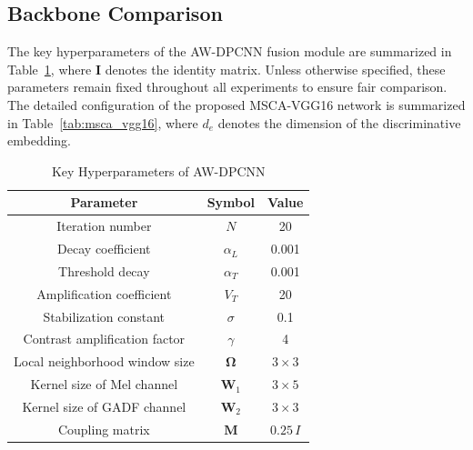 \documentclass[anonymous]{iopjournal}
\begin{document}
\subsection{Backbone Comparison}
The key hyperparameters of the AW-DPCNN fusion module are summarized in Table~\ref{tab:awdpcnn_params}, where $\mathbf I$ denotes the identity matrix. Unless otherwise specified, these parameters remain fixed throughout all experiments to ensure fair comparison. The detailed configuration of the proposed MSCA-VGG16 network is summarized in Table~\ref{tab:msca_vgg16}, where $d_e$ denotes the dimension of the discriminative embedding.
\begin{table}
	\centering
	\caption{Key Hyperparameters of AW-DPCNN}
	\label{tab:awdpcnn_params}
	\begin{tabular}{ccc}
		\hline
		\textbf{Parameter} & \textbf{Symbol} & \textbf{Value} \\
		\hline
		Iteration number & $N$ & 20 \\
		Decay coefficient & $\alpha_L$ & 0.001 \\
		Threshold decay & $\alpha_T$ & 0.001 \\
		Amplification coefficient & $V_T$ & 20 \\
		Stabilization constant & $\sigma$ & 0.1 \\
		Contrast amplification factor & $\gamma$ & 4 \\
		Local neighborhood window size & $\boldsymbol{\Omega}$ & $3 \times 3$ \\
		Kernel size of Mel channel & $\boldsymbol{W}_1$ & $3 \times 5$ \\
		Kernel size of GADF channel & $\boldsymbol{W}_2$ & $3 \times 3$ \\
		Coupling matrix & $\boldsymbol{M}$ & $$0.25\,I$$ \\
		\hline
	\end{tabular}
\end{table}
\end{document}
